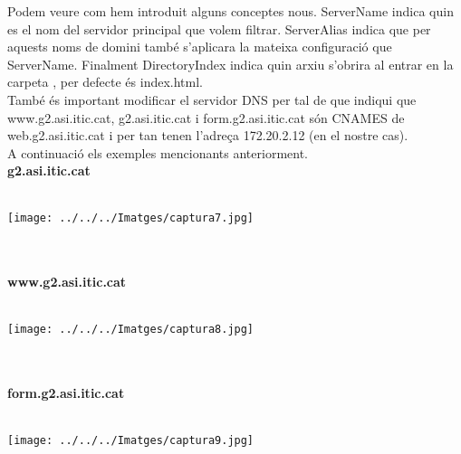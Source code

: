 \documentclass[11p]{article}
\begin{document}
Podem veure com hem introduit alguns conceptes nous. ServerName indica quin es el nom del servidor principal que volem filtrar. ServerAlias indica que per aquests noms de domini també s'aplicara la mateixa configuració que ServerName. Finalment DirectoryIndex indica quin arxiu s'obrira al entrar en la carpeta , per defecte és index.html.\\
També és important modificar el servidor DNS per tal de que indiqui que www.g2.asi.itic.cat, g2.asi.itic.cat i form.g2.asi.itic.cat són CNAMES de web.g2.asi.itic.cat i per tan tenen l'adreça 172.20.2.12 (en el nostre cas).\\
A continuació els exemples mencionants anteriorment.\\
\newpage
\textbf{g2.asi.itic.cat}\\\\
\centerline{\texttt{[image: ../../../Imatges/captura7.jpg]} }\\\\
\textbf{www.g2.asi.itic.cat}\\\\
\centerline{\texttt{[image: ../../../Imatges/captura8.jpg]} }\\\\
\newpage
\textbf{form.g2.asi.itic.cat}\\\\
\centerline{\texttt{[image: ../../../Imatges/captura9.jpg]} }
\end{document}
